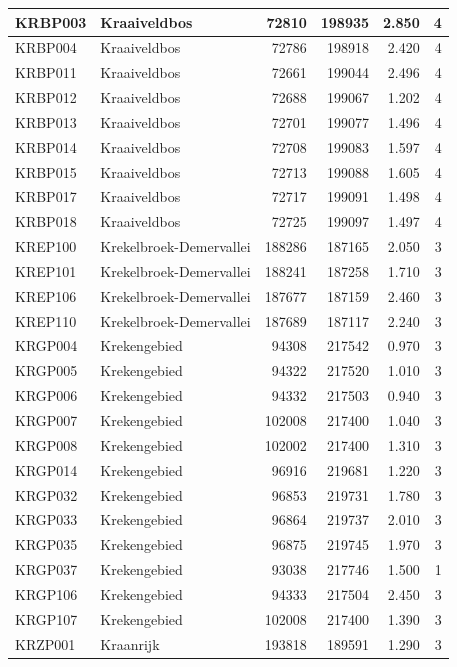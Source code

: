 \documentclass[11pt,]{book}
\begin{document}
\begin{table}
\begin{tabular}[t]{l|l|r|r|r|r}
\hline
KRBP003 & Kraaiveldbos & 72810 & 198935 & 2.850 & 4\\
\hline
KRBP004 & Kraaiveldbos & 72786 & 198918 & 2.420 & 4\\
\hline
KRBP011 & Kraaiveldbos & 72661 & 199044 & 2.496 & 4\\
\hline
KRBP012 & Kraaiveldbos & 72688 & 199067 & 1.202 & 4\\
\hline
KRBP013 & Kraaiveldbos & 72701 & 199077 & 1.496 & 4\\
\hline
KRBP014 & Kraaiveldbos & 72708 & 199083 & 1.597 & 4\\
\hline
KRBP015 & Kraaiveldbos & 72713 & 199088 & 1.605 & 4\\
\hline
KRBP017 & Kraaiveldbos & 72717 & 199091 & 1.498 & 4\\
\hline
KRBP018 & Kraaiveldbos & 72725 & 199097 & 1.497 & 4\\
\hline
KREP100 & Krekelbroek-Demervallei & 188286 & 187165 & 2.050 & 3\\
\hline
KREP101 & Krekelbroek-Demervallei & 188241 & 187258 & 1.710 & 3\\
\hline
KREP106 & Krekelbroek-Demervallei & 187677 & 187159 & 2.460 & 3\\
\hline
KREP110 & Krekelbroek-Demervallei & 187689 & 187117 & 2.240 & 3\\
\hline
KRGP004 & Krekengebied & 94308 & 217542 & 0.970 & 3\\
\hline
KRGP005 & Krekengebied & 94322 & 217520 & 1.010 & 3\\
\hline
KRGP006 & Krekengebied & 94332 & 217503 & 0.940 & 3\\
\hline
KRGP007 & Krekengebied & 102008 & 217400 & 1.040 & 3\\
\hline
KRGP008 & Krekengebied & 102002 & 217400 & 1.310 & 3\\
\hline
KRGP014 & Krekengebied & 96916 & 219681 & 1.220 & 3\\
\hline
KRGP032 & Krekengebied & 96853 & 219731 & 1.780 & 3\\
\hline
KRGP033 & Krekengebied & 96864 & 219737 & 2.010 & 3\\
\hline
KRGP035 & Krekengebied & 96875 & 219745 & 1.970 & 3\\
\hline
KRGP037 & Krekengebied & 93038 & 217746 & 1.500 & 1\\
\hline
KRGP106 & Krekengebied & 94333 & 217504 & 2.450 & 3\\
\hline
KRGP107 & Krekengebied & 102008 & 217400 & 1.390 & 3\\
\hline
KRZP001 & Kraanrijk & 193818 & 189591 & 1.290 & 3\\

\end{tabular}
\end{table}
\end{document}
